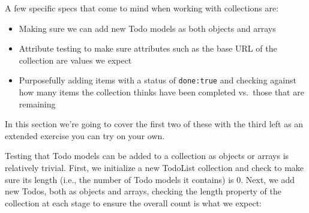 \documentclass[9pt]{book}
\begin{document}
A few specific specs that come to mind when working with collections
are:

\begin{itemize}
\itemsep1pt\parskip0pt
\item
  Making sure we can add new Todo models as both objects and arrays
\item
  Attribute testing to make sure attributes such as the base URL of the
  collection are values we expect
\item
  Purposefully adding items with a status of \texttt{done:true} and
  checking against how many items the collection thinks have been
  completed vs.~those that are remaining
\end{itemize}

In this section we're going to cover the first two of these with the
third left as an extended exercise you can try on your own.

Testing that Todo models can be added to a collection as objects or
arrays is relatively trivial. First, we initialize a new TodoList
collection and check to make sure its length (i.e., the number of Todo
models it contains) is 0. Next, we add new Todos, both as objects and
arrays, checking the length property of the collection at each stage to
ensure the overall count is what we expect:
\end{document}
